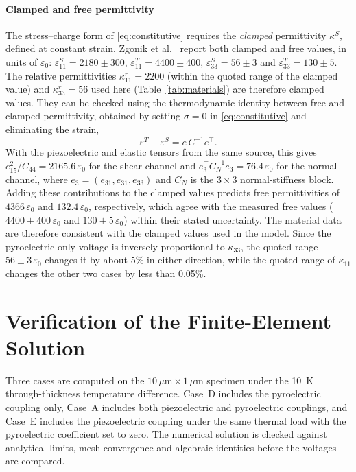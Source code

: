 \documentclass[a4paper,12pt]{elsarticle}
\begin{document}
\paragraph{Clamped and free permittivity}
The stress--charge form of \eqref{eq:constitutive} requires the \emph{clamped}
permittivity $\kappa^S$, defined at constant strain. Zgonik et al.~\cite{Zgonik1994} report both clamped and free values, in units of $\varepsilon_0$:
$\varepsilon_{11}^S=2180\pm300$, $\varepsilon_{11}^T=4400\pm400$,
$\varepsilon_{33}^S=56\pm3$ and $\varepsilon_{33}^T=130\pm5$. The relative
permittivities $\kappa_{11}^r=2200$ (within the quoted range of the clamped value)
and $\kappa_{33}^r=56$ used here (Table~\ref{tab:materials}) are therefore clamped
values. They can be checked using the thermodynamic identity between free and clamped
permittivity, obtained by setting $\sigma=0$ in \eqref{eq:constitutive} and eliminating
the strain,
\begin{equation}
\varepsilon^T-\varepsilon^S=e\,C^{-1}e^{\!\top}.
\label{eq:dielectric-identity}
\end{equation}
With the piezoelectric and elastic tensors from the same source, this gives
$e_{15}^2/C_{44}=2165.6\,\varepsilon_0$ for the shear channel and
$e_3^{\!\top}C_N^{-1}e_3=76.4\,\varepsilon_0$ for the normal channel, where
$e_3=(e_{31},e_{31},e_{33})$ and $C_N$ is the $3\times3$ normal-stiffness block.
Adding these contributions to the clamped values predicts free permittivities of
$4366\,\varepsilon_0$ and $132.4\,\varepsilon_0$, respectively, which agree with the
measured free values
($4400\pm400\,\varepsilon_0$ and $130\pm5\,\varepsilon_0$) within their stated
uncertainty. The material data are therefore consistent with the clamped values used
in the model. Since the pyroelectric-only voltage is inversely proportional to
$\kappa_{33}$, the quoted range $56\pm3\,\varepsilon_0$ changes it by about 5\% in
either direction, while the quoted range of $\kappa_{11}$ changes the other two cases
by less than 0.05\%.

\section{Verification of the Finite-Element Solution}
\label{sec:verification}

Three cases are computed on the $10\,\mu\text{m}\times1\,\mu\text{m}$ specimen under the
10~K through-thickness temperature difference. Case~D includes the pyroelectric
coupling only, Case~A includes both piezoelectric and pyroelectric couplings, and
Case~E includes the piezoelectric coupling under the same thermal load with the
pyroelectric coefficient set to zero. The numerical solution is checked against analytical limits, mesh convergence
and algebraic identities before the voltages are compared.
\end{document}
